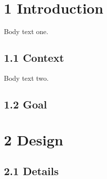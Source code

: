 \documentclass[11pt,a4paper]{article}
\begin{document}
\section{1 Introduction}

Body text one.

\subsection{1.1 Context}

Body text two.

\subsection{1.2 Goal}

\section{2 Design}

\subsection{2.1 Details}
\end{document}
